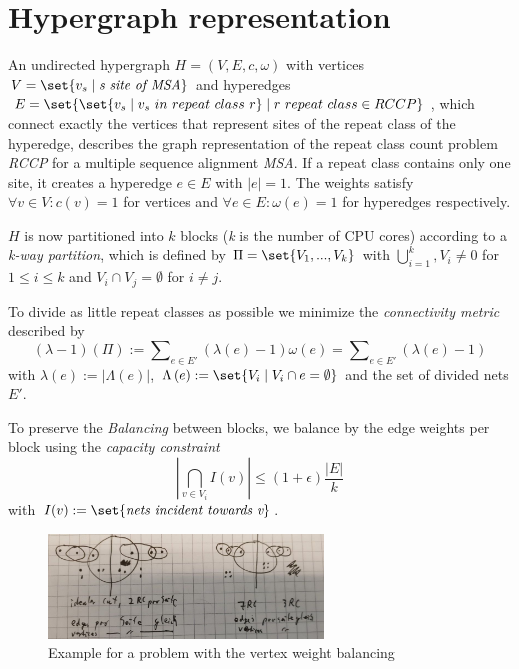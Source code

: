 \documentclass{article}
\DeclarePairedDelimiter\set\{\}
\begin{document}
	\section{Hypergraph representation}
	An undirected hypergraph $H=\left( V,E,c,\omega \right)$ with vertices $V=\set{ v_s \mid \textit{s site of MSA}}$ and hyperedges $E=\set{
		\set{
			v_s \mid v_s\ in\ repeat\ class\ r
		} \mid r\ repeat\ class \in RCCP
	}$, which connect exactly the vertices that represent sites of the repeat class of the hyperedge, describes the graph representation of the repeat class count problem \textit{RCCP} for a multiple sequence alignment \textit{MSA}. If a repeat class contains only one site, it creates a hyperedge $e \in E$ with $|e|=1$. The weights satisfy  $\forall v \in V: c\left(v\right)=1$ for vertices and $\forall e \in E: \omega\left(e\right)=1$ for hyperedges respectively.
	
	$H$ is now partitioned into $k$ blocks (\textit{k} is the number of CPU cores) according to a \textit{k-way partition}, which is defined by $\Pi = \set{V_1,...,V_k}$ with $\bigcup\nolimits_{i=1}^k, V_i \ne 0$ for $1 \leq i \leq k$ and $V_i \cap V_j = \emptyset$ for $i \neq j$.
	
	To divide as little repeat classes as possible we minimize the \textit{connectivity metric} described by  \[ \left(\lambda-1\right)\left(\Pi\right):=\sum\nolimits_{e \in E'}\left(\lambda\left(e\right)-1\right)\omega\left(e\right) = \sum\nolimits_{e \in E'}\left(\lambda\left(e\right)-1\right) \] with $\lambda\left(e\right):=|\Lambda\left(e\right)|$, $\Lambda\left(e\right):=\set{V_i \mid V_i \cap e = \emptyset}$ and the set of divided nets $E'$. 
	
	To preserve the \textit{Balancing} between blocks, we balance by the edge weights per block using the \textit{capacity constraint} \[ \left|\bigcap_{v \in V_i}I\left(v\right)\right| \leq \left(1+\epsilon\right)\frac{\left|E\right|}{k} \] with $I(v):=\set{\textit{nets incident towards v}}$.
	
	\begin{figure}[ht]
		\centering
		\includegraphics[width=0.65\textwidth]{example.png}
		\caption{Example for a problem with the vertex weight balancing}
		\label{fig:example}
	\end{figure}
	
\end{document}
